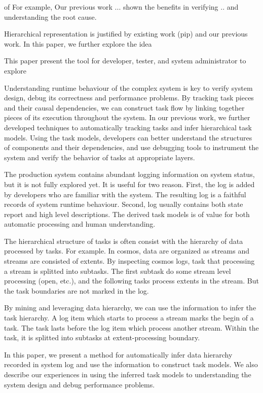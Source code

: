 of 
For example, 
Our previous work ...
shown the benefits in verifying .. and understanding the
root cause. 


Hierarchical representation is justified by existing
work (pip) and our previous work. In this paper, we further
explore the idea


This paper present the tool for developer, tester, 
and system administrator to explore 





Understanding runtime behaviour of the complex system is key
to verify system design, debug its correctness and
performance problems. By tracking task pieces and their
causal dependencies, we can construct task flow by linking
together pieces of its execution throughout the system.  In
our previous work, we further developed techniques to
automatically tracking tasks and infer hierarchical task
models. Using the task models, developers can better
understand the structures of components and their
dependencies, and use debugging tools to instrument the
system and verify the behavior of tasks at appropriate
layers.

The production system contains abundant logging information
on system status, but it is not fully explored yet. It is
useful for two reason. First, the log is added by developers
who are familiar with the system.  The resulting log is a
faithful records of system runtime behaviour. Second, log
usually contains both state report and high level
descriptions. The derived task models is of value for both
automatic processing and human understanding.

The hierarchical structure of tasks is often consist with
the hierarchy of data processed by tasks. For example. In
cosmos, data are organized as streams and streams are
consisted of extents. By inspecting cosmos logs, task that
processing a stream is splitted into subtasks. The first
subtask do some stream level processing (open, etc.), and
the following tasks process extents in the stream. But the
task boundaries are not marked in the log.

By mining and leveraging data hierarchy, we can use the
information to infer the task hierarchy. A log item which
starts to process a stream marks the begin of a task. The
task lasts before the log item which process another stream.
Within the task, it is splitted into subtasks at
extent-processing boundary.

In this paper, we present a method for automatically infer
data hierarchy recorded in system log and use the
information to construct task models.  We also describe our
experiences in using the inferred task models to
understanding the system design and debug performance
problems.

